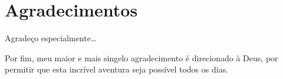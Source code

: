 %
%

\chapter*{Agradecimentos}

Agradeço especialmente\ldots

Por fim, meu maior e mais singelo agradecimento é direcionado à Deus, por
permitir que esta incrível aventura seja possível todos os dias.

\mbox{}
\newpage